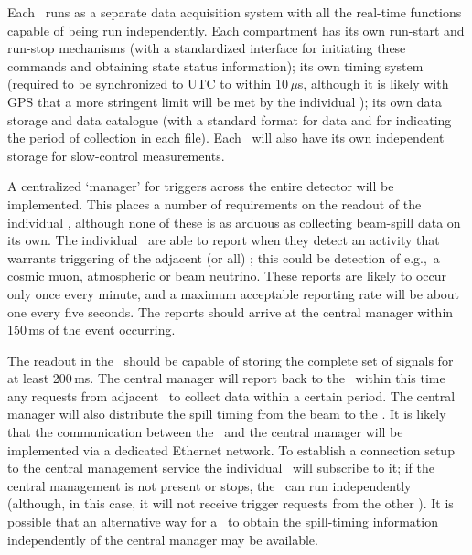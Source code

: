 Each \COMPARTMENT\ runs as a separate data acquisition system with all
the real-time functions capable of being run independently.
Each compartment has its own run-start and run-stop mechanisms (with a
standardized interface for initiating these commands and obtaining
state status information); its own timing system (required to be
synchronized to UTC to within 10\,$\mu$s, although it is likely with GPS
that a more stringent limit will be met by the individual
\COMPARTMENTS); its own data storage and data catalogue (with
a standard format for data and for indicating the period of collection
in each file).   Each \COMPARTMENT\ will also have its own independent
storage for slow-control measurements.

A centralized `manager' for triggers across the entire detector will
be implemented.  This places a number of requirements on the readout
of the individual \COMPARTMENTS, although %
none of these is as arduous as  collecting beam-spill data on its own. 
The individual \COMPARTMENTS\ are able to report when they detect an activity that warrants triggering of the adjacent (or all) \COMPARTMENTS;
this could be detection of  e.g.,\ a cosmic muon, atmospheric or beam neutrino.  These reports are likely to occur only once every minute,
and a maximum acceptable reporting rate %
will be about one every five seconds.  The reports should arrive at
the central manager within 150\,ms of the event occurring.

The readout in the \COMPARTMENTS\ should be capable of storing the
complete set of signals for at least 200\,ms.  The central manager
will report back to the \COMPARTMENTS\ within this time any requests
from adjacent \COMPARTMENTS\ to collect data within a certain period.
The central manager will also distribute the spill timing from the
beam to the \COMPARTMENTS.  It is likely that the
communication between the \COMPARTMENTS\ and the central manager will be
implemented via a dedicated Ethernet network.%
To establish a connection setup to the central management service
the individual \COMPARTMENT\ will subscribe to it; if the central management is not present
or stops, the \COMPARTMENT\ can run independently (although, in this case,
it will not receive trigger requests from the other \COMPARTMENTS).  It is possible that an alternative way for a \COMPARTMENT\
to obtain the spill-timing information independently of the central
manager may be available. \fixme{this sentence is pretty vague}

